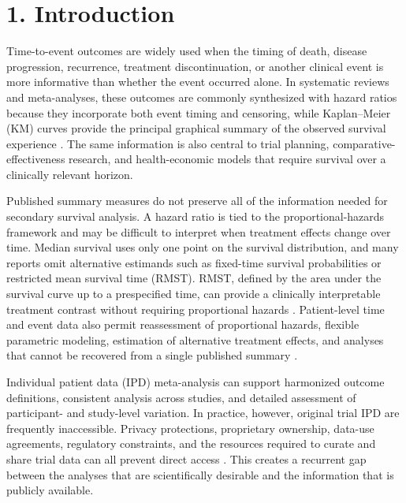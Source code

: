 \documentclass[12pt,letterpaper]{article}
\begin{document}
\linenumbers

\section*{1. Introduction}

Time-to-event outcomes are widely used when the timing of death, disease progression, recurrence, treatment discontinuation, or another clinical event is more informative than whether the event occurred alone. In systematic reviews and meta-analyses, these outcomes are commonly synthesized with hazard ratios because they incorporate both event timing and censoring, while Kaplan--Meier (KM) curves provide the principal graphical summary of the observed survival experience \cite{tierney2007}. The same information is also central to trial planning, comparative-effectiveness research, and health-economic models that require survival over a clinically relevant horizon.

Published summary measures do not preserve all of the information needed for secondary survival analysis. A hazard ratio is tied to the proportional-hazards framework and may be difficult to interpret when treatment effects change over time. Median survival uses only one point on the survival distribution, and many reports omit alternative estimands such as fixed-time survival probabilities or restricted mean survival time (RMST). RMST, defined by the area under the survival curve up to a prespecified time, can provide a clinically interpretable treatment contrast without requiring proportional hazards \cite{royston2013}. Patient-level time and event data also permit reassessment of proportional hazards, flexible parametric modeling, estimation of alternative treatment effects, and analyses that cannot be recovered from a single published summary \cite{guyot2012,wei2017}.

Individual patient data (IPD) meta-analysis can support harmonized outcome definitions, consistent analysis across studies, and detailed assessment of participant- and study-level variation. In practice, however, original trial IPD are frequently inaccessible. Privacy protections, proprietary ownership, data-use agreements, regulatory constraints, and the resources required to curate and share trial data can all prevent direct access \cite{liu2021,kim2025}. This creates a recurrent gap between the analyses that are scientifically desirable and the information that is publicly available.
\end{document}
